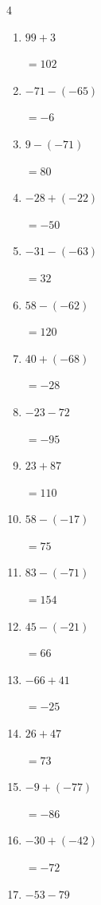 \begin{multicols}{4}
\begin{enumerate}
  \item $99+3$

        $=102$

  \item $-71-(-65)$

        $=-6$

  \item $9-(-71)$

        $=80$

  \item $-28+(-22)$

        $=-50$

  \item $-31-(-63)$

        $=32$

  \item $58-(-62)$

        $=120$

\columnbreak %

  \item $40+(-68)$

        $=-28$

  \item $-23-72$

        $=-95$

  \item $23+87$

        $=110$

  \item $58-(-17)$

        $=75$

  \item $83-(-71)$

        $=154$

  \item $45-(-21)$

        $=66$

  \item $-66+41$

        $=-25$

  \item $26+47$

        $=73$

  \item $-9+(-77)$

        $=-86$

  \item $-30+(-42)$

        $=-72$

  \item $-53-79$


\end{enumerate}
\end{multicols}
